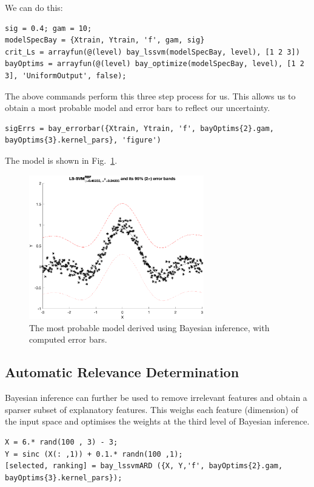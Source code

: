 \documentclass[10pt,a4paper]{article}
\begin{document}
We can do this:

\begin{lstlisting}[style=Matlab-editor, frame=single]
sig = 0.4; gam = 10;
modelSpecBay = {Xtrain, Ytrain, 'f', gam, sig}
crit_Ls = arrayfun(@(level) bay_lssvm(modelSpecBay, level), [1 2 3])
bayOptims = arrayfun(@(level) bay_optimize(modelSpecBay, level), [1 2 3], 'UniformOutput', false);
\end{lstlisting}

The above commands perform this three step process for us. This allows us to obtain a most probable model and error bars to reflect our uncertainty.

\begin{lstlisting}[style=Matlab-editor]
sigErrs = bay_errorbar({Xtrain, Ytrain, 'f', bayOptims{2}.gam, bayOptims{3}.kernel_pars}, 'figure')
\end{lstlisting}

The model is shown in Fig.~\ref{fig:bayesianErrorbars}.

\begin{figure}[h!]
\centering
  \includegraphics[width=3in]{bayesianErrorbars.png}
  \caption{The most probable model derived using Bayesian inference, with computed error bars.}
  \label{fig:bayesianErrorbars}
\end{figure}

\subsection{Automatic Relevance Determination}
Bayesian inference can further be used to remove irrelevant features and obtain a sparser subset of explanatory features. This weighs each feature (dimension) of the input space and optimises the weights at the third level of Bayesian inference.

\begin{lstlisting}[style=Matlab-editor, frame=single]
X = 6.* rand(100 , 3) - 3;
Y = sinc (X(: ,1)) + 0.1.* randn(100 ,1);
[selected, ranking] = bay_lssvmARD ({X, Y,'f', bayOptims{2}.gam, bayOptims{3}.kernel_pars});
\end{lstlisting}
\end{document}
